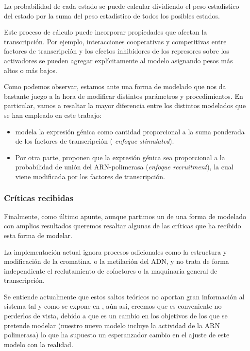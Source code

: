   La probabilidad de cada estado se puede calcular dividiendo el peso estadístico del estado por la suma del peso estadístico de todos los posibles estados. 
 
 Este proceso de cálculo puede incorporar propiedades que afectan la transcripción. Por ejemplo, interacciones cooperativas y competitivas entre factores de transcripción y los efectos inhibidores de los represores sobre los activadores se pueden agregar explícitamente al modelo asignando pesos más altos o más bajos.
 
 Como podemos observar, estamos ante una forma de modelado que nos da bastante juego a la hora de modificar distintos parámetros y procedimientos. En particular, vamos a resaltar la mayor diferencia entre los distintos modelados que se han empleado en este trabajo:
 \begin{itemize}
 	\item \cite{schaffer} modela la expresión génica como cantidad proporcional a la suma ponderada de los factores de transcripción (\textit{ enfoque stimulated}).
 	\item Por otra parte, \cite{cambon1} proponen que la expresión génica sea proporcional a la probabilidad de unión del ARN-polimerasa (\textit{enfoque recruitment}), la cual viene modificada por los factores de transcripción.
 		
 		
 	\end{itemize}
 
 
 
 
 \subsubsection{Críticas recibidas}
 
 
 Finalmente, como último apunte, aunque partimos un de una forma de modelado con amplios resultados queremos resaltar algunas de las críticas que ha recibido esta forma de modelar.
 
 La implementación actual ignora procesos adicionales como la estructura y modificación de la cromatina, o la metilación del ADN, y no trata de forma independiente el reclutamiento de cofactores o la maquinaria general de transcripción.
 
  Se entiende actualmente que estos saltos teóricos no aportan gran información al sistema tal y como se expone en \cite{ay2011mathematical}, aún así, creemos que es conveniente no perderlos de vista, debido a que es un cambio en los objetivos de los que se pretende modelar (nuestro nuevo modelo incluye la actividad de la ARN polimerasa) lo que ha supuesto un esperanzador cambio en el ajuste de este modelo con la realidad.